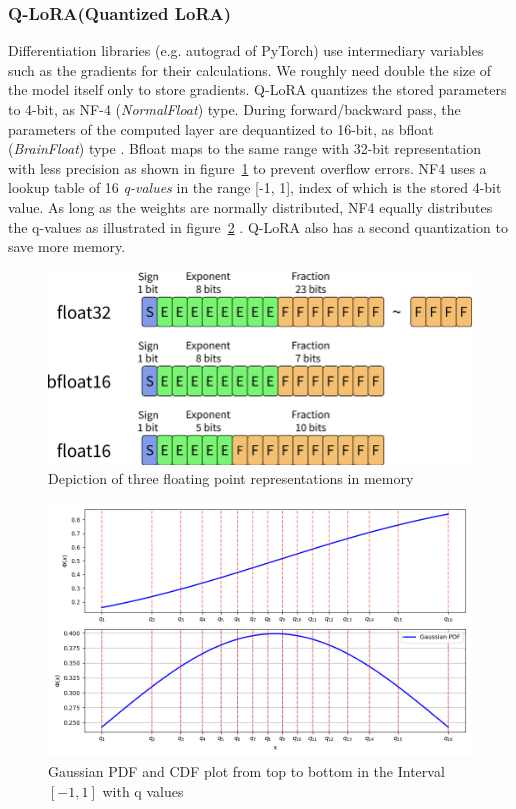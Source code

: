 \documentclass{article}
\begin{document}
\subsubsection{Q-LoRA(Quantized LoRA)}\label{qlora}
Differentiation libraries (e.g. autograd of PyTorch) use intermediary variables such as the gradients for their calculations. We roughly need double the size of the model itself only to store gradients. Q-LoRA quantizes the stored parameters to 4-bit, as NF-4 (\textit{NormalFloat}) type. During forward/backward pass, the parameters of the computed layer are dequantized to 16-bit, as bfloat (\textit{BrainFloat}) type \cite{dettmers_qlora_2023}. Bfloat maps to the same range with 32-bit representation with less precision as shown in figure~\ref{fig:bfloat} to prevent overflow errors. NF4 uses a lookup table of 16 \textit{q-values} in the range [-1, 1], index of which is the stored 4-bit value. As long as the weights are normally distributed, NF4 equally distributes the q-values  as illustrated in figure~\ref{fig:nf4} \cite{dettmers_8-bit_2022}. Q-LoRA also has a second quantization to save more memory.

\begin{figure}[H]
    \centering
    \includegraphics[width=0.5\linewidth]{pictures/bfloat.png}
    \caption{Depiction of three floating point representations in memory \cite{grobbelaar_pygmalionaipygmalion-7b_2023}}
    \label{fig:bfloat} 
\end{figure}

\begin{figure}[H]
    \centering
    \includegraphics[width=0.5\linewidth]{pictures/nf4.png}
    \caption{Gaussian PDF and CDF plot from top to bottom in the Interval $[-1, 1]$ with q values}
    \label{fig:nf4}
\end{figure}
\end{document}
